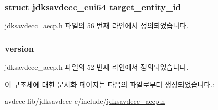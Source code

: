 \subsubsection[{\texorpdfstring{target\+\_\+entity\+\_\+id}{target_entity_id}}]{\setlength{\rightskip}{0pt plus 5cm}struct {\bf jdksavdecc\+\_\+eui64} target\+\_\+entity\+\_\+id}\hypertarget{structjdksavdecc__aecpdu__common__control__header_a6928214f4610ef10e95ba5c74ac5b06e}{}\label{structjdksavdecc__aecpdu__common__control__header_a6928214f4610ef10e95ba5c74ac5b06e}


jdksavdecc\+\_\+aecp.\+h 파일의 56 번째 라인에서 정의되었습니다.

\subsubsection[{\texorpdfstring{version}{version}}]{ version}\hypertarget{structjdksavdecc__aecpdu__common__control__header_ab22abc2906422da61885ac6c8e6a1a59}{}\label{structjdksavdecc__aecpdu__common__control__header_ab22abc2906422da61885ac6c8e6a1a59}


jdksavdecc\+\_\+aecp.\+h 파일의 52 번째 라인에서 정의되었습니다.



이 구조체에 대한 문서화 페이지는 다음의 파일로부터 생성되었습니다.\+:\begin{DoxyCompactItemize}
\item 
avdecc-\/lib/jdksavdecc-\/c/include/\hyperlink{jdksavdecc__aecp_8h}{jdksavdecc\+\_\+aecp.\+h}\end{DoxyCompactItemize}
